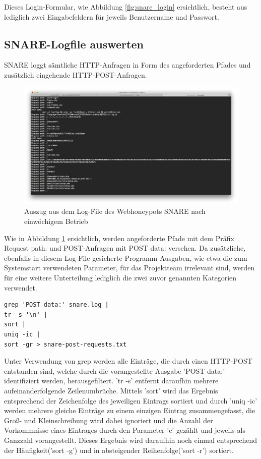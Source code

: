 Dieses Login-Formular, wie Abbildung \ref{fig:snare_login} ersichtlich, besteht aus lediglich zwei Eingabefeldern für jeweils Benutzername und Passwort.

\subsection{SNARE-Logfile auswerten}
\label{subsec:Installation und Konfiguration SNARE}

SNARE loggt sämtliche HTTP-Anfragen in Form des angeforderten Pfades und zusätzlich eingehende HTTP-POST-Anfragen.

\begin{figure}[ht]
	\centering
		\includegraphics[width=1.0\textwidth]{img/snare_logfile.png}
	\caption{Auszug aus dem Log-File des Webhoneypots SNARE nach einwöchigem Betrieb}
	\label{fig:snare_logfile}
\end{figure}

Wie in Abbildung \ref{fig:snare_logfile} ersichtlich, werden angeforderte Pfade mit dem Präfix \grqq{}Request path:\grqq{} und POST-Anfragen mit \grqq{}POST data:\grqq{} versehen. Da zusätzliche, ebenfalls in diesem Log-File gesicherte Programm-Ausgaben, wie etwa die zum Systemstart verwendeten Parameter, für das Projektteam irrelevant sind, werden für eine weitere Unterteilung lediglich die zwei zuvor genannten Kategorien verwendet.


\begin{lstlisting}[style=customc]
grep 'POST data:' snare.log |
tr -s '\n' |
sort |
uniq -ic |
sort -gr > snare-post-requests.txt
\end{lstlisting}

Unter Verwendung von grep werden alle Einträge, die durch einen HTTP-POST entstanden sind, welche durch die vorangestellte Ausgabe 'POST data:' identifiziert werden, herausgefiltert. 'tr -s' entfernt daraufhin mehrere aufeinanderfolgende Zeilenumbrüche. Mittels 'sort' wird das Ergebnis entsprechend der Zeichenfolge des jeweiligen Eintrags sortiert und durch 'uniq -ic' werden mehrere gleiche Einträge zu einem einzigen Eintrag zusammengefasst, die Groß- und Kleinschreibung wird dabei ignoriert und die Anzahl der Vorkommnisse eines Eintrages durch den Parameter 'c' gezählt und jeweils als Ganzzahl vorangestellt. Dieses Ergebnis wird daraufhin noch einmal entsprechend der Häufigkeit('sort -g') und in absteigender Reihenfolge('sort -r') sortiert.

